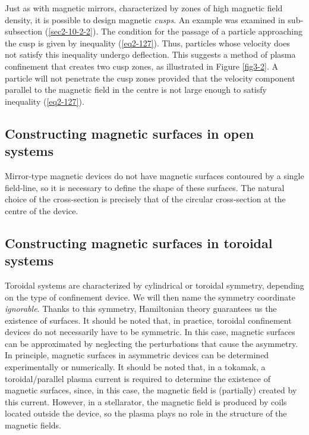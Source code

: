 \quad Just as with magnetic mirrors, characterized by zones of high magnetic field density, it is possible to design magnetic \textit{cusps}. An example was examined in sub-subsection (\ref{sec2-10-2-2}). The condition for the passage of a particle approaching the cusp is given by inequality (\ref{eq2-127}). Thus, particles whose velocity does not satisfy this inequality undergo deflection. This suggests a method of plasma confinement that creates two cusp zones, as illustrated in Figure \ref{fig3-2}. A particle will not penetrate the cusp zones provided that the velocity component parallel to the magnetic field in the centre is not large enough to satisfy inequality (\ref{eq2-127}).

\subsection{Constructing magnetic surfaces in open systems}

Mirror-type magnetic devices do not have magnetic surfaces contoured by a single field-line, so it is necessary to define the shape of these surfaces. The natural choice of the cross-section is precisely that of the circular cross-section at the centre of the device.

\subsection{Constructing magnetic surfaces in toroidal systems}

Toroidal systems are characterized by cylindrical or toroidal symmetry, depending on the type of confinement device. We will then name the symmetry coordinate \textit{ignorable}. Thanks to this symmetry, Hamiltonian theory guarantees us the existence of surfaces. It should be noted that, in practice, toroidal confinement devices do not necessarily have to be symmetric. In this case, magnetic surfaces can be approximated by neglecting the perturbations that cause the asymmetry. In principle, magnetic surfaces in asymmetric devices can be determined experimentally or numerically. It should be noted that, in a tokamak, a toroidal/parallel plasma current is required to determine the existence of magnetic surfaces, since, in this case, the magnetic field is (partially) created by this current. However, in a stellarator, the magnetic field is produced by coils located outside the device, so the plasma plays no role in the structure of the magnetic fields.

